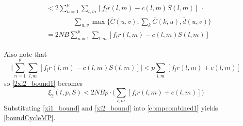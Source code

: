 \begin{IEEEproof}
\begin{small}
\begin{align}
&< 2 \sum_{n=1}^{p}  \sum_{l,m}[f_{l}r(l,m) - c(l,m)S(l,m)] \; \cdot \\ \nonumber
&\qquad \qquad \sum_{u,v} \max\Big\{  \overline{C}(u,v), \sum_{k}\overline{C}(k,u), \overline{d}(u,v)\Big\} \\
& = 2NB \sum_{n=1}^{p}  \sum_{l,m}[f_{l}r(l,m) - c(l,m)S(l,m)] \label{2xi2_bound1}
\end{align}
\end{small}Also note that 
\begin{equation*}
\Big| \sum_{n=1}^{p}  \sum_{l,m}[f_{l}r(l,m) - c(l,m)S(l,m)] \Big| < p \sum_{l,m}[f_{l}r(l,m) + c(l,m)]
\end{equation*}
so \eqref{2xi2_bound1} becomes
\begin{equation} \label{xi2_bound}
\xi_2(t,p,S) < 2 NB p \cdot \Big( \sum_{l,m}[f_{l}r(l,m) + c(l,m)]\Big)
\end{equation}
Substituting \eqref{xi1_bound} and \eqref{xi2_bound} into \eqref{cbmpcombined1} yields \eqref{boundCycleMP}.
\end{IEEEproof}\vspace{-1em}


